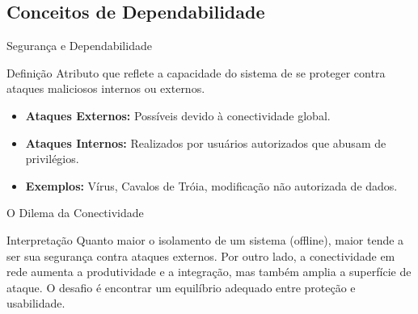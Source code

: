 \documentclass[aspectratio=169]{beamer}
\begin{document}
\subsection{Conceitos de Dependabilidade}
\begin{frame}{Segurança e Dependabilidade}
    \begin{block}{Definição}
        Atributo que reflete a capacidade do sistema de se proteger contra ataques maliciosos internos ou externos.
    \end{block}
    \begin{itemize}
        \item \textbf{Ataques Externos:} Possíveis devido à conectividade global.
        \item \textbf{Ataques Internos:} Realizados por usuários autorizados que abusam de privilégios.
        \item \textbf{Exemplos:} Vírus, Cavalos de Tróia, modificação não autorizada de dados.
    \end{itemize}
\end{frame}

\begin{frame}{O Dilema da Conectividade}

    \centering

    \begin{block}{Interpretação}
        Quanto maior o isolamento de um sistema (offline), maior tende a ser sua segurança contra ataques externos. 
        Por outro lado, a conectividade em rede aumenta a produtividade e a integração, mas também amplia a superfície de ataque. 
        O desafio é encontrar um equilíbrio adequado entre proteção e usabilidade.
    \end{block}

\end{frame}
\end{document}
